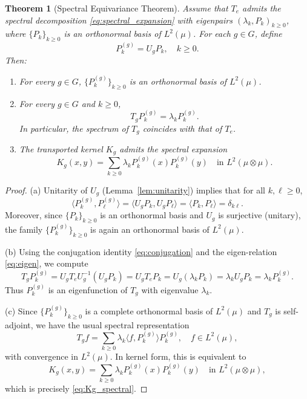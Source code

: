 \documentclass[11pt,a4paper]{article}
\newtheorem{theorem}{Theorem}[section]
\newcommand{\ip}[2]{\langle #1, #2 \rangle}
\begin{document}
\begin{theorem}[Spectral Equivariance Theorem]\label{thm:spectral_equivariance}
Assume that $T_e$ admits the spectral decomposition \eqref{eq:spectral_expansion} with eigenpairs $(\lambda_k, P_k)_{k \geq 0}$, where $\{P_k\}_{k \geq 0}$ is an orthonormal basis of $L^2(\mu)$. For each $g \in G$, define
\[
P_k^{(g)} = U_g P_k, \quad k \geq 0.
\]
Then:
\begin{enumerate}[label=(\alph*)]
\item For every $g \in G$, $\{P_k^{(g)}\}_{k \geq 0}$ is an orthonormal basis of $L^2(\mu)$.
\item For every $g \in G$ and $k \geq 0$,
\[
T_g P_k^{(g)} = \lambda_k P_k^{(g)}.
\]
In particular, the spectrum of $T_g$ coincides with that of $T_e$.
\item The transported kernel $K_g$ admits the spectral expansion
\begin{equation}\label{eq:Kg_spectral}
K_g(x, y) = \sum_{k \geq 0} \lambda_k P_k^{(g)}(x) P_k^{(g)}(y) \quad \text{in } L^2(\mu \otimes \mu).
\end{equation}
\end{enumerate}
\end{theorem}

\begin{proof}
(a) Unitarity of $U_g$ (Lemma~\ref{lem:unitarity}) implies that for all $k, \ell \geq 0$,
\[
\ip{P_k^{(g)}}{P_\ell^{(g)}} = \ip{U_g P_k}{U_g P_\ell} = \ip{P_k}{P_\ell} = \delta_{k\ell}.
\]
Moreover, since $\{P_k\}_{k \geq 0}$ is an orthonormal basis and $U_g$ is surjective (unitary), the family $\{P_k^{(g)}\}_{k \geq 0}$ is again an orthonormal basis of $L^2(\mu)$.

(b) Using the conjugation identity \eqref{eq:conjugation} and the eigen-relation \eqref{eq:eigen}, we compute
\[
T_g P_k^{(g)} = U_g T_e U_g^{-1}(U_g P_k) = U_g T_e P_k = U_g(\lambda_k P_k) = \lambda_k U_g P_k = \lambda_k P_k^{(g)}.
\]
Thus $P_k^{(g)}$ is an eigenfunction of $T_g$ with eigenvalue $\lambda_k$.

(c) Since $\{P_k^{(g)}\}_{k \geq 0}$ is a complete orthonormal basis of $L^2(\mu)$ and $T_g$ is self-adjoint, we have the usual spectral representation
\[
T_g f = \sum_{k \geq 0} \lambda_k \ip{f}{P_k^{(g)}} P_k^{(g)}, \quad f \in L^2(\mu),
\]
with convergence in $L^2(\mu)$. In kernel form, this is equivalent to
\[
K_g(x, y) = \sum_{k \geq 0} \lambda_k P_k^{(g)}(x) P_k^{(g)}(y) \quad \text{in } L^2(\mu \otimes \mu),
\]
which is precisely \eqref{eq:Kg_spectral}.
\end{proof}
\end{document}
